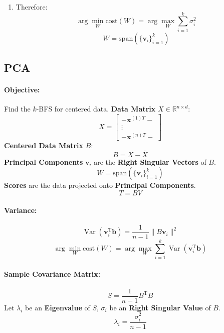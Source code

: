 \documentclass{article}
\begin{document}
\begin{enumerate}
    \paragraph{Solutions:}
    \begin{itemize}
        \item $\mathbf{q}_i = \mathbf{v}_i$ is an \textbf{Eigenvector} of $A^{\mathrm{T}} A$
        \item $\lambda = \lambda_i$ is an \textbf{Eigenvalue} of $A^{\mathrm{T}} A$
        \item $\mathbf{q}_i = \mathbf{v}_i$ is a \textbf{Right Singular Vector} of $A$
        \item $\sqrt{\lambda} = \sigma_i$ is a \textbf{Singular Value} of $A$
    \end{itemize}
    \[
        \mathbf{q}_i^{\mathrm{T}} A^{\mathrm{T}} A \mathbf{q}_i = \mathbf{v}_i^{\mathrm{T}} \lambda_i \mathbf{v}_i = \lambda_i = \sigma_i^2
    \]

    \item Therefore:
    \[
        \arg\min_{W} \text{cost}(W) = \arg\max_{W} \sum_{i=1}^{k} \sigma_i^2
    \]
    \[
        W = \text{span}(\{\mathbf{v}_i\}_{i=1}^{k})
    \]
\end{enumerate}

\subsection{PCA}

\paragraph{Objective:} Find the $k$-BFS for centered data.
\newline
\textbf{Data Matrix} $X \in \mathbb{R}^{n \times d}$:
\[
    X =
    \begin{bmatrix}
        - \mathbf{x}^{(1)T} - \\
        \vdots \\
        - \mathbf{x}^{(n)T} -
    \end{bmatrix}
\]
\textbf{Centered Data Matrix} $B$:
\[
    B = X - \overline{X}
\]
\textbf{Principal Components} $\mathbf{v}_i$ are the \textbf{Right Singular Vectors} of $B$.
\[
    W = \text{span}(\{\mathbf{v}_i\}_{i=1}^{k})
\]
\textbf{Scores} are the data projected onto \textbf{Principal Components}.
\[
    T = BV
\]
\paragraph{Variance:}
\[
    \operatorname{Var}(\mathbf{v}_i^{\mathrm{T}} \mathbf{b}) = \frac{1}{n-1} \|B\mathbf{v}_i\|^2
\]
\[
    \arg \min_W \text{cost}(W) = \arg \max_W \sum_{i=1}^k \operatorname{Var}(\mathbf{v}_i^{\mathrm{T}} \mathbf{b})
\]
\paragraph{Sample Covariance Matrix:}
\[
    S = \frac{1}{n-1} B^{\mathrm{T}} B
\]
Let $\lambda_i$ be an \textbf{Eigenvalue} of $S$, $\sigma_i$ be an \textbf{Right Singular Value} of $B$.
\[
    \lambda_i = \frac{\sigma_i^2}{n-1}
\]
\end{document}
